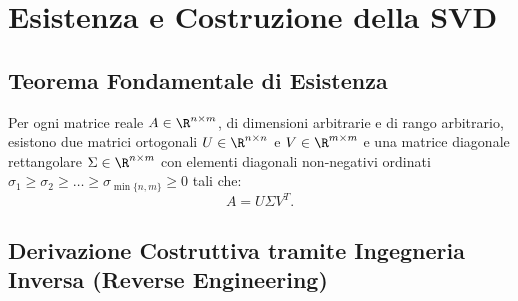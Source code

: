\FloatBarrier
\section{Esistenza e Costruzione della SVD}
\label{sec:svd-esistenza-costruzione}

\subsection{Teorema Fondamentale di Esistenza}

\begin{theorem}
\label{thm:esistenza-svd}
Per ogni matrice reale $A \in \R^{n \times m}$, di dimensioni arbitrarie e di rango arbitrario, esistono due matrici ortogonali $U \in \R^{n \times n}$ e $V \in \R^{m \times m}$ e una matrice diagonale rettangolare $\Sigma \in \R^{n \times m}$ con elementi diagonali non-negativi ordinati $\sigma_1 \ge \sigma_2 \ge \dots \ge \sigma_{\min\{n,m\}} \ge 0$ tali che:
\begin{equation}
    A = U \Sigma V^T.
\end{equation}
\end{theorem}

\subsection{Derivazione Costruttiva tramite Ingegneria Inversa (Reverse Engineering)}

